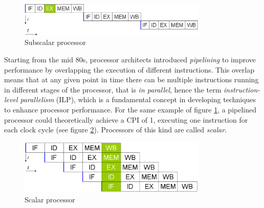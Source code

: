 \begin{figure}[hbtp]
  \centering
  \includegraphics[width=0.8\textwidth]{img/subscalar.png}
  \caption{Subscalar processor}
  \label{fig:subscalar}
\end{figure}

Starting from the mid 80s, processor architects introduced \emph{pipelining} to improve performance by overlapping the execution of different instructions. This overlap means that at any given point in time there can be multiple instructions running in different stages of the processor, that is \emph{in parallel}, hence the term \emph{instruction-level parallelism} (ILP), which is a fundamental concept in developing techniques to enhance processor performance. For the same example of figure \ref{fig:subscalar}, a pipelined processor could theoretically achieve a CPI of 1, executing one instruction for each clock cycle (see figure \ref{fig:scalar}). Processors of this kind are called \emph{scalar}.

\begin{figure}[hbtp]
  \centering
  \includegraphics[width=0.8\textwidth]{img/scalar.png}
  \caption{Scalar processor}
  \label{fig:scalar}
\end{figure}

